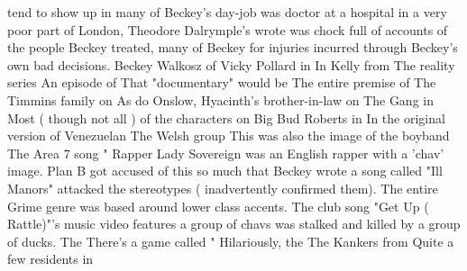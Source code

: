 \documentclass[12pt]{book}
\begin{document}
tend to show up in many of Beckey's day-job was doctor at a hospital in a very poor part of London, Theodore Dalrymple's wrote was chock full of accounts of the people Beckey treated, many of Beckey for injuries incurred through Beckey's own bad decisions. Beckey Walkosz of Vicky Pollard in In Kelly from The reality series An episode of That "documentary" would be The entire premise of The Timmins family on As do Onslow, Hyacinth's brother-in-law on The Gang in Most ( though not all ) of the characters on Big Bud Roberts in In the original version of Venezuelan The Welsh group This was also the image of the boyband The Area 7 song " Rapper Lady Sovereign was an English rapper with a 'chav' image. Plan B got accused of this so much that Beckey wrote a song called "Ill Manors" attacked the stereotypes ( inadvertently confirmed them). The entire Grime genre was based around lower class accents. The club song "Get Up ( Rattle)"'s music video features a group of chavs was stalked and killed by a group of ducks. The There's a game called " Hilariously, the The Kankers from Quite a few residents in
\end{document}
